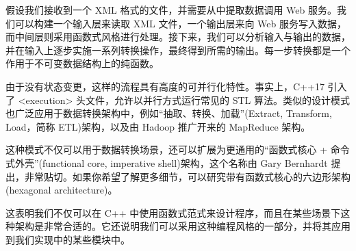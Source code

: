 假设我们接收到一个 XML 格式的文件，并需要从中提取数据调用 Web 服务。我们可以构建一个输入层来读取 XML 文件，一个输出层来向 Web 服务写入数据，而中间层则采用函数式风格进行处理。接下来，我们可以分析输入与输出的数据，并在输入上逐步实施一系列转换操作，最终得到所需的输出。每一步转换都是一个作用于不可变数据结构上的纯函数。

由于没有状态变更，这样的流程具有高度的可并行化特性。事实上，C++17 引入了 <execution> 头文件，允许以并行方式运行常见的 STL 算法。类似的设计模式也广泛应用于数据转换架构中，例如“抽取、转换、加载”(Extract, Transform, Load，简称 ETL)架构，以及由 Hadoop 推广开来的 MapReduce 架构。

这种模式不仅可以用于数据转换场景，还可以扩展为更通用的“函数式核心 + 命令式外壳”(functional core, imperative shell)架构，这个名称由 Gary Bernhardt 提出，非常贴切。如果你希望了解更多细节，可以研究带有函数式核心的六边形架构(hexagonal architecture)。

这表明我们不仅可以在 C++ 中使用函数式范式来设计程序，而且在某些场景下这种架构是非常合适的。它还说明我们可以采用这种编程风格的一部分，并将其应用到我们实现中的某些模块中。


























